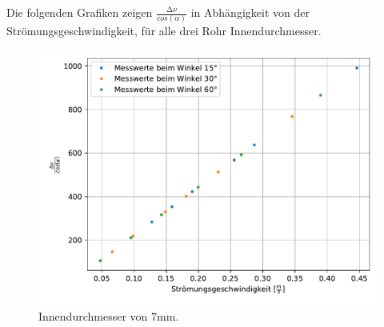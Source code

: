 \noindent
Die folgenden Grafiken zeigen $\frac{\increment \nu}{cos(\alpha)}$ in Abhängigkeit von der Strömungsgeschwindigkeit, für alle drei Rohr Innendurchmesser.

\begin{figure}
    \centering
    \includegraphics{Daten/7mm.pdf}
    \caption{Innendurchmesser von 7mm.}
    \label{fig:KeineAhnung}
\end{figure}


